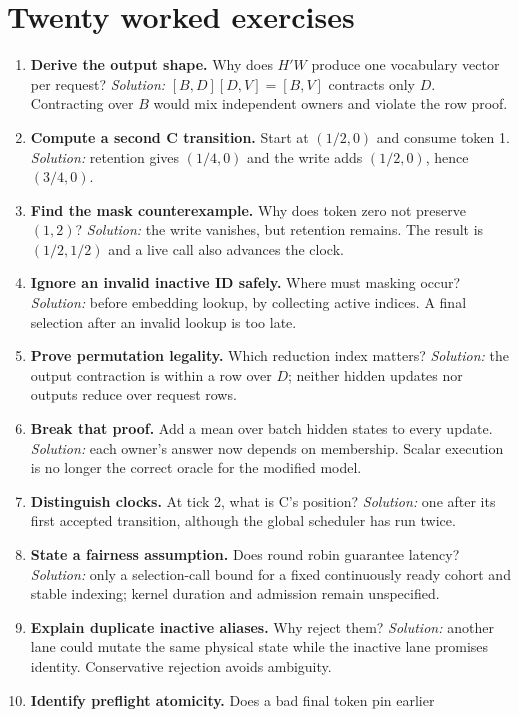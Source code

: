 \section{Twenty worked exercises}
\label{evod34:exercises}
\begin{enumerate}
\item \textbf{Derive the output shape.} Why does $H'W$ produce one vocabulary
vector per request? \emph{Solution:} $[B,D][D,V]=[B,V]$ contracts only $D$.
Contracting over $B$ would mix independent owners and violate the row proof.
\item \textbf{Compute a second C transition.} Start at $(1/2,0)$ and consume
token 1. \emph{Solution:} retention gives $(1/4,0)$ and the write adds
$(1/2,0)$, hence $(3/4,0)$.
\item \textbf{Find the mask counterexample.} Why does token zero not preserve
$(1,2)$? \emph{Solution:} the write vanishes, but retention remains.
The result is $(1/2,1/2)$ and a live call also advances the clock.
\item \textbf{Ignore an invalid inactive ID safely.} Where must masking occur?
\emph{Solution:} before embedding lookup, by collecting active indices.
A final selection after an invalid lookup is too late.
\item \textbf{Prove permutation legality.} Which reduction index matters?
\emph{Solution:} the output contraction is within a row over $D$;
neither hidden updates nor outputs reduce over request rows.
\item \textbf{Break that proof.} Add a mean over batch hidden states to every
update. \emph{Solution:} each owner's answer now depends on membership.
Scalar execution is no longer the correct oracle for the modified model.
\item \textbf{Distinguish clocks.} At tick 2, what is C's position?
\emph{Solution:} one after its first accepted transition, although the global
scheduler has run twice.
\item \textbf{State a fairness assumption.} Does round robin guarantee latency?
\emph{Solution:} only a selection-call bound for a fixed continuously ready
cohort and stable indexing; kernel duration and admission remain unspecified.
\item \textbf{Explain duplicate inactive aliases.} Why reject them?
\emph{Solution:} another lane could mutate the same physical state while the
inactive lane promises identity. Conservative rejection avoids ambiguity.
\item \textbf{Identify preflight atomicity.} Does a bad final token pin earlier

\end{enumerate}
